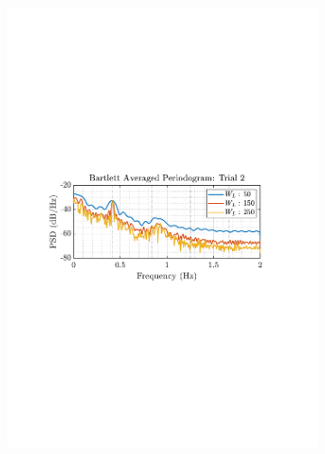 \documentclass[12pt]{article}
\numberwithin{equation}{section}
\begin{document}
\begin{figure}[H]
\begin{subfigure}{0.49\textwidth}
			\includegraphics[trim={2.2cm 11cm 3.15cm  11.2cm}, clip, width=\textwidth]{../MATLAB/figures/q1_5a_fig05.pdf} 
		\end{subfigure}
		\begin{subfigure}{0.49\textwidth}
			\centering

\end{subfigure}
\end{figure}
\end{document}

